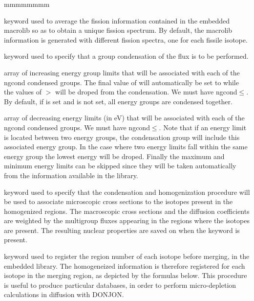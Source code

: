 \begin{ListeDeDescription}{mmmmmmmm}
\item[\moc{ONEFIS}] keyword used to average the fission information contained in the embedded macrolib so as to obtain a unique fission spectrum. By
default, the macrolib information is generated with different fission spectra, one for each fissile isotope.

\item[\moc{COND}] keyword used to specify that a group condensation of the flux is to be performed.

\item[\dusa{icond}] array of increasing energy group limits that will be associated with
each of the ngcond condensed groups. The final value of
 will automatically be set to  while the values of 
$>$ will be droped from the condensation. 
We must have ngcond$\le$. By default, if  is set and 
is not set, all energy groups are condensed together.

\item[\dusa{energy}] array of decreasing energy limits (in eV) that will be
associated with each of the ngcond condensed groups. We must have ngcond$\le$. 
Note that if an energy limit is located between two energy groups, the condensation
group will include this associated energy group. In the case where two energy
limits fall within the same energy group the lowest energy will be droped.
Finally the maximum and minimum energy limits can be skipped since they will be
taken automatically from the information available in the library.

\item[\moc{MICR}] keyword used to specify that the condensation and homogenization
procedure will be used to associate microscopic cross sections to the isotopes
present in the homogenized regions. The macroscopic cross sections and the
diffusion coefficients are weighted by the multigroup fluxes appearing in the
regions where the isotopes are present. The resulting nuclear properties are
saved on  when the  keyword is present.

\item[\moc{ALLX}] keyword used to register the region number of each isotope before merging, in the 
embedded library. The homogeneized information is therefore registered for each isotope in the merging
region, as depicted by the formulas below. This procedure is useful to produce particular databases, 
in order to perform micro-depletion calculations in diffusion with DONJON.


\end{ListeDeDescription}
